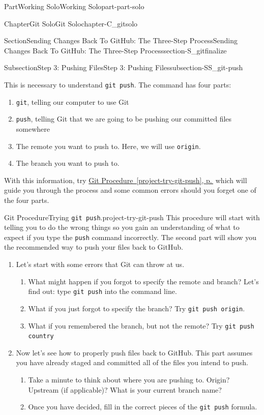 \documentclass[twoside,10pt,]{book}
\newcommand{\xreffont}{\relax}
\newcommand{\mono}[1]{\texttt{#1}}
\begin{document}
\begin{partptx}{Part}{Working Solo}{}{Working Solo}{}{}{part-part-solo}
\begin{chapterptx}{Chapter}{Git Solo}{}{Git Solo}{}{}{chapter-C_gitsolo}
\begin{sectionptx}{Section}{Sending Changes Back To GitHub: The Three-Step Process}{}{Sending Changes Back To GitHub: The Three-Step Process}{}{}{section-S_gitfinalize}
\begin{subsectionptx}{Subsection}{Step 3: Pushing Files}{}{Step 3: Pushing Files}{}{}{subsection-SS_git-push}
\par
This is necessary to understand \mono{git push}. The command has four parts:%
\begin{enumerate}
\item{}\mono{git}, telling our computer to use Git%
\item{}\mono{push}, telling Git that we are going to be pushing our committed files somewhere%
\item{}The remote you want to push to. Here, we will use \mono{origin}.%
\item{}The branch you want to push to.%
\end{enumerate}
With this information, try \hyperref[project-try-git-push]{Git Procedure~{\xreffont\ref{project-try-git-push}}, p.\,\pageref{project-try-git-push}} which will guide you through the process and some common errors should you forget one of the four parts.%
\begin{project}{Git Procedure}{Trying \mono{git push}.}{project-try-git-push}%
This procedure will start with telling you to do the wrong things so you gain an understanding of what to expect if you type the \mono{push} command incorrectly. The second part will show you the recommended way to push your files back to GitHub.%
\begin{enumerate}[font=\bfseries,label=(\alph*),ref=\alph*]%
\item{}Let's start with some errors that Git can throw at us.%
\begin{enumerate}[font=\bfseries,label=(\roman*),ref=\theenumi.\roman*]%
\item{}What might happen if you forgot to specify the remote and branch? Let's find out: type \mono{git push} into the command line.%
\item{}What if you just forgot to specify the branch? Try \mono{git push origin}.%
\item{}What if you remembered the branch, but not the remote? Try \mono{git push country}%
\end{enumerate}%
\item{}Now let's see how to properly push files back to GitHub. This part assumes you have already staged and committed all of the files you intend to push.%
\begin{enumerate}[font=\bfseries,label=(\roman*),ref=\theenumi.\roman*]%
\item{}Take a minute to think about where you are pushing to. Origin? Upstream (if applicable)? What is your current branch name?%
\item{}Once you have decided, fill in the correct pieces of the \mono{git push} formula.%

\end{enumerate}
\end{enumerate}
\end{project}
\end{subsectionptx}
\end{sectionptx}
\end{chapterptx}
\end{partptx}
\end{document}
